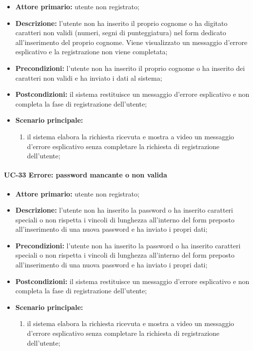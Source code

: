 	\begin{itemize}
		\item \textbf{Attore primario:} utente non registrato;

		\item \textbf{Descrizione:} l'utente non ha inserito il proprio cognome o ha digitato caratteri non validi (numeri, segni di punteggiatura) nel form dedicato all'inserimento del proprio cognome. Viene visualizzato un messaggio d'errore esplicativo e la registrazione non viene completata;

		\item \textbf{Precondizioni:} l'utente non ha inserito il proprio cognome o ha inserito dei caratteri non validi e ha inviato i dati al sistema;

		\item \textbf{Postcondizioni:} il sistema restituisce un messaggio d'errore esplicativo e non completa la fase di registrazione dell'utente;

		\item \textbf{Scenario principale:}
	  		\begin{enumerate}
		  		\item il sistema elabora la richiesta ricevuta e mostra a video un messaggio d'errore esplicativo senza completare la richiesta di registrazione dell'utente; 
	  		\end{enumerate}
	\end{itemize}

\paragraph{UC-33 Errore: password mancante o non valida}

	\begin{itemize}
		\item \textbf{Attore primario:} utente non registrato;

		\item \textbf{Descrizione:} l'utente non ha inserito la password o ha inserito caratteri speciali o non rispetta i vincoli di lunghezza all'interno del form preposto all'inserimento di una nuova password e ha inviato i propri dati;

		\item \textbf{Precondizioni:} l'utente non ha inserito la password o ha inserito caratteri speciali o non rispetta i vincoli di lunghezza all'interno del form preposto all'inserimento di una nuova password e ha inviato i propri dati;

		\item \textbf{Postcondizioni:} il sistema restituisce un messaggio d'errore esplicativo e non completa la fase di registrazione dell'utente;

		\item \textbf{Scenario principale:}
	  		\begin{enumerate}
		  		\item il sistema elabora la richiesta ricevuta e mostra a video un messaggio d'errore esplicativo senza completare la richiesta di registrazione dell'utente; 
	  		\end{enumerate}
	\end{itemize}


